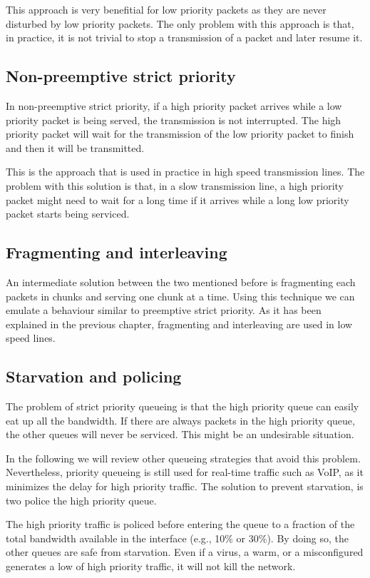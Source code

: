 This approach is very benefitial for low priority packets as they are never disturbed by low priority packets.
The only problem with this approach is that, in practice, it is not trivial to stop a transmission of a packet and later resume it.

\subsection{Non-preemptive strict priority}
In non-preemptive strict priority, if a high priority packet arrives while a low priority packet is being served, the transmission is not interrupted.
The high priority packet will wait for the transmission of the low priority packet to finish and then it will be transmitted.

This is the approach that is used in practice in high speed transmission lines.
The problem with this solution is that, in a slow transmission line, a high priority packet might need to wait for a long time if it arrives while a long low priority packet starts being serviced.

\subsection{Fragmenting and interleaving}
An intermediate solution between the two mentioned before is fragmenting each packets in chunks and serving one chunk at a time. 
Using this technique we can emulate a behaviour similar to preemptive strict priority.
As it has been explained in the previous chapter, fragmenting and interleaving are used in low speed lines.

\subsection{Starvation and policing}
The problem of strict priority queueing is that the high priority queue can easily eat up all the bandwidth.
If there are always packets in the high priority queue, the other queues will never be serviced.
This might be an undesirable situation.

In the following we will review other queueing strategies that avoid this problem.
Nevertheless, priority queueing is still used for real-time traffic such as VoIP, as it minimizes the delay for high priority traffic.
The solution to prevent starvation, is two police the high priority queue.

The high priority traffic is policed before entering the queue to a fraction of the total bandwidth available in the interface (e.g., 10\% or 30\%).
By doing so, the other queues are safe from starvation.
Even if a virus, a warm, or a misconfigured generates a low of high priority traffic, it will not kill the network.


